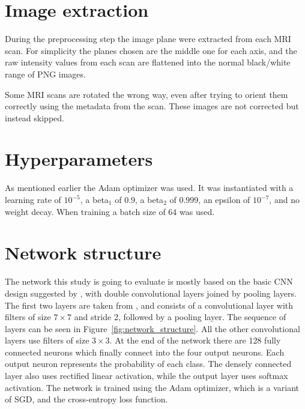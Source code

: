 \documentclass{kththesis}
\begin{document}
\begin{minipage}{.7\linewidth}
\vspace*{-50mm}
\section{Image extraction} \label{image_extraction}
During the preprocessing step the image plane were extracted from each MRI scan. For simplicity the planes chosen are the middle one for each axis, and the raw intensity values from each scan are flattened into the normal black/white range of PNG images.

Some MRI scans are rotated the wrong way, even after trying to orient them correctly using the metadata from the scan. These images are not corrected but instead skipped.

\section{Hyperparameters}
As mentioned earlier the Adam optimizer was used. It was instantiated with a learning rate of $10^{-5}$, a beta$_1$ of $0.9$, a beta$_2$ of $0.999$, an epsilon of $10^{-7}$, and no weight decay. When training a batch size of $64$ was used.

\section{Network structure} \label{network_structure}
  The network this study is going to evaluate is mostly based on the basic CNN design suggested by \textcite{cnnIntro}, with double convolutional layers joined by pooling layers. The first two layers are taken from \textcite{islam2018early}, and consists of a convolutional layer with filters of size $7 \times 7$ and stride 2, followed by a pooling layer. The sequence of layers can be seen in Figure~\ref{fig:network_structure}. All the other convolutional layers use filters of size $3 \times 3$. At the end of the network there are 128 fully connected neurons which finally connect into the four output neurons. Each output neuron represents the probability of each class. The densely connected layer also uses rectified linear activation, while the output layer uses softmax activation. The network is trained using the Adam optimizer, which is a variant of SGD, and the cross-entropy loss function.

\end{minipage}
\end{document}

